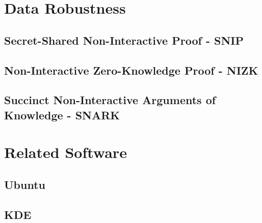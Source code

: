 \section{Data Robustness}
\label{sec:related:data_robustness}


%
%
\subsection{Secret-Shared Non-Interactive Proof - SNIP}
\label{subsec:related:snip}
%


%
%
\subsection{Non-Interactive Zero-Knowledge Proof - NIZK}
\label{subsec:related:nizk}
%


%
%
\subsection{Succinct Non-Interactive Arguments of Knowledge - SNARK}
\label{subsec:snark}
%




\section{Related Software}
\label{sec:related_work:related_sw}
%

\subsection{Ubuntu}

\subsection{KDE}



